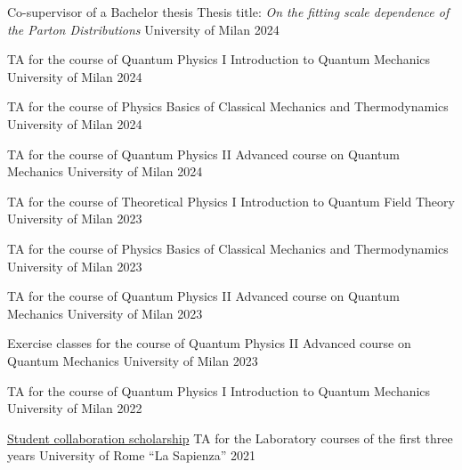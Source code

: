 
\begin{cvhonors}

    \cvhonor
    {Co-supervisor of a Bachelor thesis} %
    {Thesis title: \textit{On the fitting scale dependence of the Parton Distributions}}
    {University of Milan} %
    {2024}

    \cvhonor
    {TA for the course of Quantum Physics I} %
    {Introduction to Quantum Mechanics}
    {University of Milan} %
    {2024}

    \cvhonor
    {TA for the course of Physics} %
    {Basics of Classical Mechanics and Thermodynamics}
    {University of Milan} %
    {2024}

    \cvhonor
    {TA for the course of Quantum Physics II} %
    {Advanced course on Quantum Mechanics}
    {University of Milan} %
    {2024}

    \cvhonor
    {TA for the course of Theoretical Physics I} %
    {Introduction to Quantum Field Theory}
    {University of Milan} %
    {2023}

    \cvhonor
    {TA for the course of Physics} %
    {Basics of Classical Mechanics and Thermodynamics}
    {University of Milan} %
    {2023}

    \cvhonor
    {TA for the course of Quantum Physics II} %
    {Advanced course on Quantum Mechanics}
    {University of Milan} %
    {2023}

    \cvhonor
    {Exercise classes for the course of Quantum Physics II} %
    {Advanced course on Quantum Mechanics}
    {University of Milan} %
    {2023}

    \cvhonor
    {TA for the course of Quantum Physics I} %
    {Introduction to Quantum Mechanics}
    {University of Milan} %
    {2022}

    \cvhonor
    {\vspace{0.35cm}\href{https://www.uniroma1.it/en/pagina/student-collaboration-scholarships}{Student collaboration scholarship}} %
    {TA for the Laboratory courses of the first three years}
    {University of Rome ``La Sapienza''} %
    {\vspace{0.35cm}2021}

\end{cvhonors}